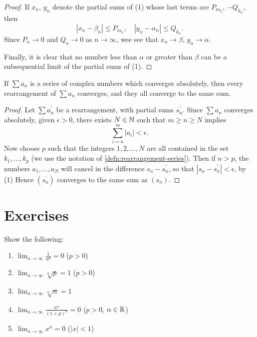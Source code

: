 \begin{proof}
If $x_n$, $y_n$ denote the partial sums of (1) whose last terms are $P_{m_n}$, $-Q_{k_n}$, then
\[|x_n-\beta_n|\le P_{m_n},\quad|y_n-\alpha_n|\le Q_{k_n}.\]
Since $P_n\to0$ and $Q_n\to0$ as $n\to\infty$, wee see that $x_n\to\beta$, $y_n\to\alpha$.

Finally, it is clear that no number less than $\alpha$ or greater than $\beta$ can be a subsequential limit of the partial sums of (1).

\end{proof}

\begin{theorem}
If $\sum a_n$ is a series of complex numbers which converges absolutely, then every rearrangement of $\sum a_n$ converges, and they all converge to the same sum.
\end{theorem}

\begin{proof}
Let $\sum a_n^\prime$ be a rearrangement, with partial sums $s_n^\prime$. Since $\sum a_n$ converges absolutely, given $\epsilon>0$, there exists $N\in\mathbb N$ such that $m\ge n\ge N$ implies
\begin{equation*}\tag{1}
\sum_{i=n}^{m}|a_i|<\epsilon.
\end{equation*}
Now choose $p$ such that the integers $1,2,\dots,N$ are all contained in the set $k_1,\dots,k_p$ (we use the notation of \cref{defn:rearrangement-series}). Then if $n>p$, the numbers $a_1,\dots,a_N$ will cancel in the difference $s_n-s_n^\prime$, so that $|s_n-s_n^\prime|<\epsilon$, by (1) Hence $(s_n^\prime)$ converges to the same sum as $(s_n)$. 
\end{proof}
\pagebreak

\section*{Exercises}
\begin{exercise}
Show the following:
\begin{enumerate}[label=(\roman*)]
\item $\displaystyle\lim_{n\to\infty}\frac{1}{n^p}=0$ ($p>0$)
\item $\displaystyle\lim_{n\to\infty}\sqrt[n]{p}=1$ ($p>0$)
\item $\displaystyle\lim_{n\to\infty}\sqrt[n]{n}=1$
\item $\displaystyle\lim_{n\to\infty}\frac{n^\alpha}{(1+p)^n}=0$ ($p>0$, $\alpha\in\mathbb R$)
\item $\displaystyle\lim_{n\to\infty}x^n=0$ ($|x|<1$)
\end{enumerate}
\end{exercise}


